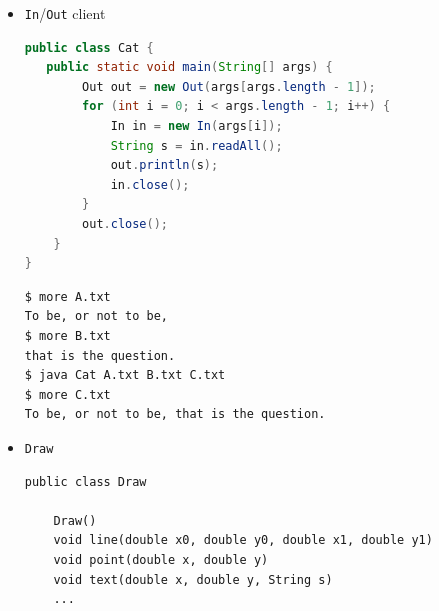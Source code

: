 \documentclass[8pt,a4paper,compress]{beamer}
\begin{document}
\begin{frame}[fragile]
\begin{itemize}
\item \lstinline{In}/\lstinline{Out} client
\begin{lstlisting}[language=Java]
public class Cat { 
   public static void main(String[] args) { 
        Out out = new Out(args[args.length - 1]);
        for (int i = 0; i < args.length - 1; i++) {
            In in = new In(args[i]);
            String s = in.readAll();
            out.println(s);
            in.close();
        }
        out.close();
    }
}
\end{lstlisting}

\begin{lstlisting}[language={}]
$ more A.txt
To be, or not to be, 
$ more B.txt
that is the question.
$ java Cat A.txt B.txt C.txt
$ more C.txt
To be, or not to be, that is the question.
\end{lstlisting}

\item \lstinline{Draw}
\begin{lstlisting}[language={},mathescape]
public class Draw

    Draw()
    void line(double x0, double y0, double x1, double y1)
    void point(double x, double y)
    void text(double x, double y, String s)
    ...
\end{lstlisting}
\end{itemize}
\end{frame}
\end{document}

